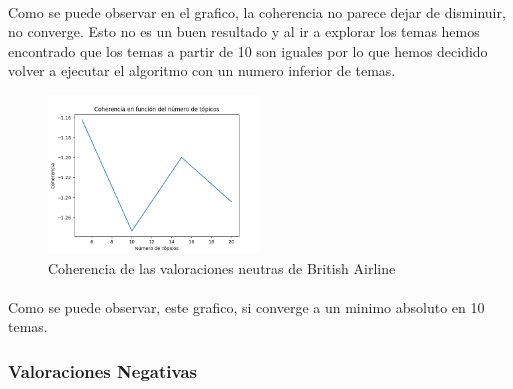 \documentclass{report}
\begin{document}
                    \paragraph*{}{
                        Como se puede observar en el grafico, la coherencia no parece dejar de disminuir, no converge.
                        Esto no es un buen resultado y al ir a explorar los temas hemos encontrado que los temas a partir de 10 son iguales por lo que hemos decidido volver a ejecutar el algoritmo con un numero inferior de temas.
                    }
                    \begin{figure}[H]
                        \centering
                        \includegraphics[width=0.5\textwidth]{./img/british_airline_neutras2.png}
                        \caption{Coherencia de las valoraciones neutras de British Airline}
                    \end{figure}
                    \paragraph*{}{
                        Como se puede observar, este grafico, si converge a un minimo absoluto en 10 temas.
                    }
                \clearpage\subsubsection*{Valoraciones Negativas}
\end{document}
